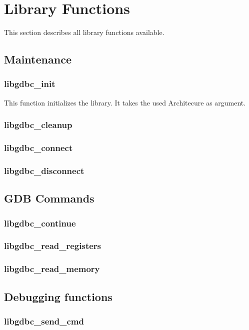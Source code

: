 \section{Library Functions}
This section describes all library functions available.
\subsection{Maintenance}
\subsubsection{libgdbc\_init}
This function initializes the library. It takes the used Architecure as argument.
\subsubsection{libgdbc\_cleanup}
\subsubsection{libgdbc\_connect}
\subsubsection{libgdbc\_disconnect}
\subsection{GDB Commands}
\subsubsection{libgdbc\_continue}
\subsubsection{libgdbc\_read\_registers}
\subsubsection{libgdbc\_read\_memory}
\subsection{Debugging functions}
\subsubsection{libgdbc\_send\_cmd}


